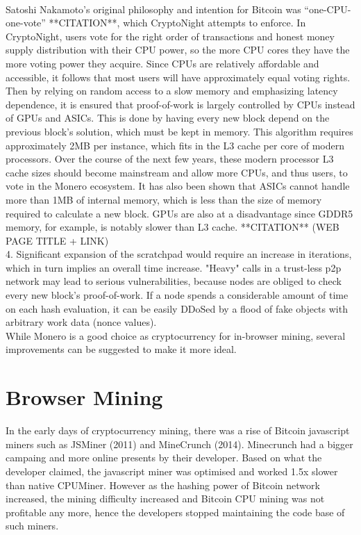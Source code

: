 \\
Satoshi Nakamoto’s original philosophy and intention for Bitcoin was “one-CPU-one-vote” **CITATION**, which CryptoNight attempts to enforce. In CryptoNight, users vote for the right order of transactions and honest money supply distribution with their CPU power, so the more CPU cores they have the more voting power they acquire. Since CPUs are relatively affordable and accessible, it follows that most users will have approximately equal voting rights. Then by relying on random access to a slow memory and emphasizing latency dependence, it is ensured that proof-of-work is largely controlled by CPUs instead of GPUs and ASICs. This is done by having every new block depend on the previous block’s solution, which must be kept in memory. This algorithm requires approximately 2MB per instance, which fits in the L3 cache per core of modern processors. Over the course of the next few years, these modern processor L3 cache sizes should become mainstream and allow more CPUs, and thus users, to vote in the Monero ecosystem. It has also been shown that ASICs cannot handle more than 1MB of internal memory, which is less than the size of memory required to calculate a new block. GPUs are also at a disadvantage since GDDR5 memory, for example, is notably slower than L3 cache. **CITATION** (WEB PAGE TITLE + LINK)
\\


4. Significant expansion of the scratchpad would require an increase in iterations, which in turn implies an overall time increase. "Heavy" calls in a trust-less p2p network may lead to serious vulnerabilities, because nodes are obliged to check every new block's proof-of-work. If a node spends a considerable amount of time on each hash evaluation, it can be easily DDoSed by a flood of fake objects with arbitrary work data (nonce values).
\\
While Monero is a good choice as cryptocurrency for in-browser mining, several improvements can be suggested to make it more ideal. %


\section{Browser Mining}

In the early days of cryptocurrency mining, there was a rise of Bitcoin javascript miners such as JSMiner (2011) and MineCrunch (2014). Minecrunch had a bigger campaing and more online presents by their developer. Based on what the developer claimed, the javascript miner was optimised and worked 1.5x slower than native CPUMiner. However as the hashing power of Bitcoin network increased, the mining difficulty increased and Bitcoin CPU mining was not profitable any more, hence the developers stopped maintaining the code base of such miners.   

